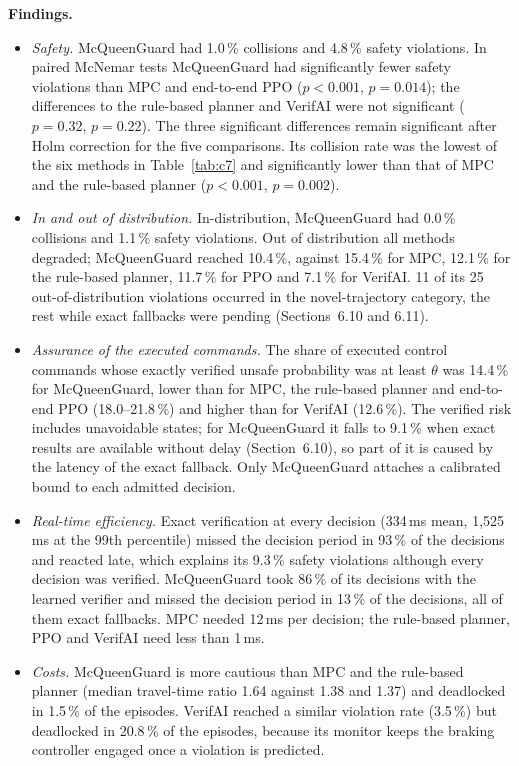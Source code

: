 \documentclass[11pt]{article}
\begin{document}
\textbf{Findings.}
\begin{itemize}[leftmargin=1.3em,itemsep=2pt]
\item \emph{Safety.} McQueenGuard had 1.0\,\% collisions and 4.8\,\% safety violations. In paired McNemar tests McQueenGuard had significantly fewer safety violations than MPC and end-to-end PPO ($p<0.001$, $p=0.014$); the differences to the rule-based planner and VerifAI were not significant ($p=0.32$, $p=0.22$). The three significant differences remain significant after Holm correction for the five comparisons. Its collision rate was the lowest of the six methods in Table~\ref{tab:c7} and significantly lower than that of MPC and the rule-based planner ($p<0.001$, $p=0.002$).
\item \emph{In and out of distribution.} In-distribution, McQueenGuard had 0.0\,\% collisions and 1.1\,\% safety violations. Out of distribution all methods degraded; McQueenGuard reached 10.4\,\%, against 15.4\,\% for MPC, 12.1\,\% for the rule-based planner, 11.7\,\% for PPO and 7.1\,\% for VerifAI. 11 of its 25 out-of-distribution violations occurred in the novel-trajectory category, the rest while exact fallbacks were pending (Sections~6.10 and 6.11).
\item \emph{Assurance of the executed commands.} The share of executed control commands whose exactly verified unsafe probability was at least $\theta$ was 14.4\,\% for McQueenGuard, lower than for MPC, the rule-based planner and end-to-end PPO (18.0--21.8\,\%) and higher than for VerifAI (12.6\,\%). The verified risk includes unavoidable states; for McQueenGuard it falls to 9.1\,\% when exact results are available without delay (Section~6.10), so part of it is caused by the latency of the exact fallback. Only McQueenGuard attaches a calibrated bound to each admitted decision.
\item \emph{Real-time efficiency.} Exact verification at every decision (334\,ms mean, 1,525\,ms at the 99th percentile) missed the decision period in 93\,\% of the decisions and reacted late, which explains its 9.3\,\% safety violations although every decision was verified. McQueenGuard took 86\,\% of its decisions with the learned verifier and missed the decision period in 13\,\% of the decisions, all of them exact fallbacks. MPC needed 12\,ms per decision; the rule-based planner, PPO and VerifAI need less than 1\,ms.
\item \emph{Costs.} McQueenGuard is more cautious than MPC and the rule-based planner (median travel-time ratio 1.64 against 1.38 and 1.37) and deadlocked in 1.5\,\% of the episodes. VerifAI reached a similar violation rate (3.5\,\%) but deadlocked in 20.8\,\% of the episodes, because its monitor keeps the braking controller engaged once a violation is predicted.
\end{itemize}
\end{document}
